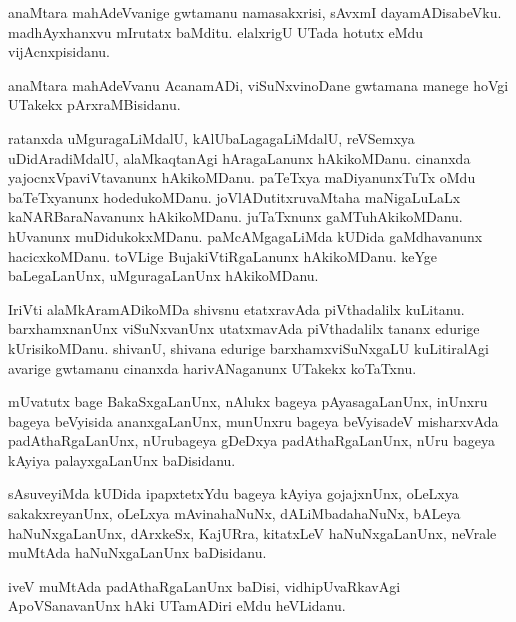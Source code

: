 \documentclass{article}
\begin{document}
\begin{mn}
anaMtara  mahAdeVvanige  gwtamanu  namasakxrisi,  sAvxmI  dayamADisabeVku.  madhAyxhanxvu  mIrutatx  
baMditu.  elalxrigU  UTada  hotutx  eMdu  vijAcnxpisidanu.
\end{mn}

\begin{mn}
anaMtara  mahAdeVvanu  AcanamADi,  viSuNxvinoDane  gwtamana  manege  hoVgi  UTakekx  pArxraMBisidanu.
\end{mn}

\begin{mn}
ratanxda  uMguragaLiMdalU,  kAlUbaLagagaLiMdalU,  reVSemxya  uDidAradiMdalU,  alaMkaqtanAgi  hAragaLanunx  
hAkikoMDanu.  cinanxda  yajocnxVpaviVtavanunx  hAkikoMDanu.  paTeTxya  maDiyanunxTuTx  oMdu  baTeTxyanunx  
hodedukoMDanu.  joVlADutitxruvaMtaha  maNigaLuLaLx  kaNARBaraNavanunx  hAkikoMDanu.  juTaTxnunx  gaMTuhAkikoMDanu.  
hUvanunx  muDidukokxMDanu.  paMcAMgagaLiMda  kUDida  gaMdhavanunx  hacicxkoMDanu.  toVLige  BujakiVtiRgaLanunx  
hAkikoMDanu.  keYge  baLegaLanUnx,  uMguragaLanUnx  hAkikoMDanu.
\end{mn}

\begin{mn}
IriVti  alaMkAramADikoMDa  shivsnu  etatxravAda  piVthadalilx  kuLitanu.  barxhamxnanUnx  viSuNxvanUnx  
utatxmavAda  piVthadalilx  tananx  edurige  kUrisikoMDanu.  shivanU,  shivana  edurige  barxhamxviSuNxgaLU  
kuLitiralAgi  avarige  gwtamanu  cinanxda  harivANaganunx  UTakekx  koTaTxnu.
\end{mn}

\begin{mn}
mUvatutx  bage  BakaSxgaLanUnx,  nAlukx  bageya  pAyasagaLanUnx,  inUnxru  bageya  beVyisida  
ananxgaLanUnx,  munUnxru  bageya  beVyisadeV  misharxvAda  padAthaRgaLanUnx,  nUrubageya  gDeDxya  
padAthaRgaLanUnx,  nUru  bageya  kAyiya  palayxgaLanUnx  baDisidanu.
\end{mn}

\begin{mn}
sAsuveyiMda  kUDida  ipapxtetxYdu  bageya  kAyiya  gojajxnUnx,  oLeLxya  sakakxreyanUnx,  oLeLxya 
mAvinahaNuNx,  dALiMbadahaNuNx,  bALeya  haNuNxgaLanUnx,  dArxkeSx,  KajURra,  kitatxLeV  
haNuNxgaLanUnx,  neVrale  muMtAda  haNuNxgaLanUnx  baDisidanu.
\end{mn}

\begin{mn}
iveV  muMtAda  padAthaRgaLanUnx  baDisi,  vidhipUvaRkavAgi  ApoVSanavanUnx  hAki  UTamADiri  eMdu  heVLidanu.
\end{mn}
\end{document}
